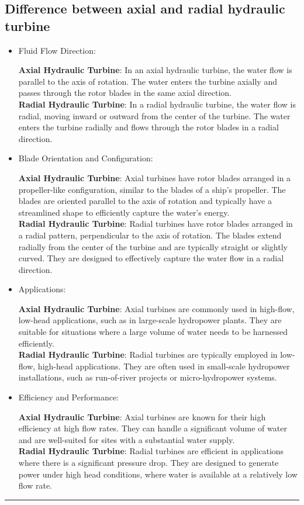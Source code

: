 \documentclass{article}
\begin{document}
\subsection*{Difference between axial and radial hydraulic turbine }
\begin{itemize}
  \item Fluid Flow Direction:

  \textbf{Axial Hydraulic Turbine}: In an axial hydraulic turbine, the water flow is parallel to the axis of rotation. The water enters the turbine axially and passes through the rotor blades in the same axial direction.\\

  \textbf{Radial Hydraulic Turbine}: In a radial hydraulic turbine, the water flow is radial, moving inward or outward from the center of the turbine. The water enters the turbine radially and flows through the rotor blades in a radial direction.
  \item Blade Orientation and Configuration:
  
  \textbf{Axial Hydraulic Turbine}: Axial turbines have rotor blades arranged in a propeller-like configuration, similar to the blades of a ship's propeller. The blades are oriented parallel to the axis of rotation and typically have a streamlined shape to efficiently capture the water's energy.\\

  \textbf{Radial Hydraulic Turbine}: Radial turbines have rotor blades arranged in a radial pattern, perpendicular to the axis of rotation. The blades extend radially from the center of the turbine and are typically straight or slightly curved. They are designed to effectively capture the water flow in a radial direction.
  \item Applications:
  
   \textbf{Axial Hydraulic Turbine}: Axial turbines are commonly used in high-flow, low-head applications, such as in large-scale hydropower plants. They are suitable for situations where a large volume of water needs to be harnessed efficiently.\\

  \textbf{Radial Hydraulic Turbine}: Radial turbines are typically employed in low-flow, high-head applications. They are often used in small-scale hydropower installations, such as run-of-river projects or micro-hydropower systems.

  \item Efficiency and Performance:
  
  \textbf{Axial Hydraulic Turbine}: Axial turbines are known for their high efficiency at high flow rates. They can handle a significant volume of water and are well-suited for sites with a substantial water supply.\\

  \textbf{Radial Hydraulic Turbine}: Radial turbines are efficient in applications where there is a significant pressure drop. They are designed to generate power under high head conditions, where water is available at a relatively low flow rate.
\end{itemize}
\hrule
\end{document}
